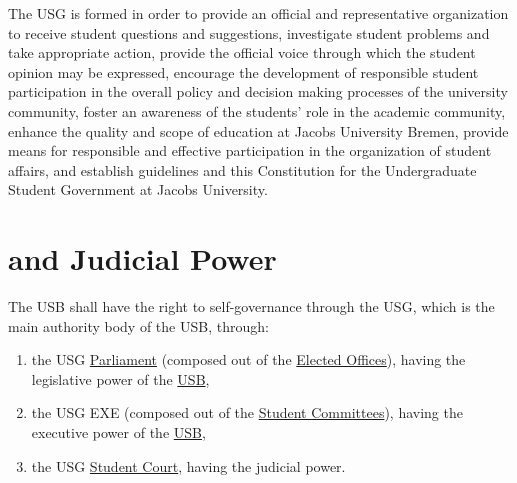 The \ac{USG}\label{USGdef} is formed in order to provide an official and representative organization to receive student questions and suggestions, investigate student problems and take appropriate action, provide the official voice through which the student opinion may be expressed, encourage the development of responsible student participation in the overall policy and decision making processes of the university community, foster an awareness of the students' role in the academic community, enhance the quality and scope of education at Jacobs University Bremen, provide means for responsible and effective participation in the organization of student affairs, and establish guidelines and this Constitution for the Undergraduate Student Government at Jacobs University.


\section{ and Judicial Power} 
The \acf{USB}\label{USBdef} shall have the right to self-governance through the \acf{USG}, which is the main authority body of the USB, through:
\begin{enumerate}
    \item the USG \hyperref[USGParliamentDef]{Parliament} \label{USGParliament} (composed out of the \hyperref[ElectedOfficesDef]{Elected Offices}), having the legislative power of the \hyperref[studentbody]{USB},
    \item the USG \acl{EXE} (composed out of the \hyperref[USGstructure]{Student Committees}), having the executive power of the \hyperref[studentbody]{USB},
    \item the USG \hyperref[StudentCourtDef]{Student Court}, having the judicial power.
\end{enumerate}


